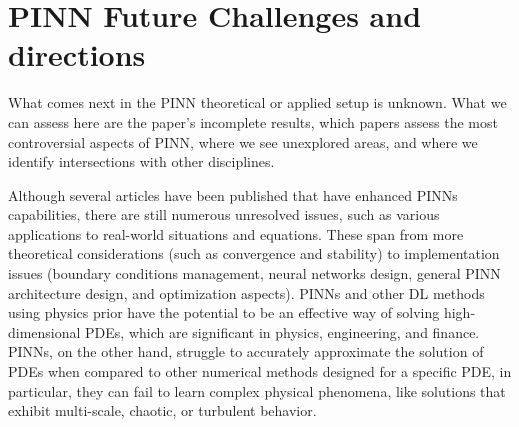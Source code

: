 \documentclass[pdflatex,sn-basic]{sn-jnl}%
\theoremstyle{thmstyleone}%
\theoremstyle{thmstyletwo}%
\theoremstyle{thmstylethree}%
\begin{document}
\FloatBarrier







% 










\section{PINN Future Challenges and directions}%

What comes next in the PINN theoretical or applied setup is unknown.
%
What we can assess here are the paper's incomplete results, which papers assess the most controversial aspects of PINN,  where we see unexplored areas, and where we identify intersections with other disciplines. 


Although several articles have been published that have enhanced PINNs capabilities, there are still numerous unresolved issues, such as various applications to real-world situations and equations. 
%
%
These span from more theoretical considerations (such as convergence and stability) to implementation issues (boundary conditions management, neural networks design, general PINN architecture design, and optimization aspects).
%
PINNs and other DL methods using physics prior have the potential to be an effective way of solving high-dimensional PDEs, which are significant in physics, engineering, and finance.
%
PINNs, on the other hand, struggle to accurately approximate the solution of PDEs when compared to other numerical methods designed for a specific PDE, in particular, they can fail to learn complex physical phenomena, like solutions that exhibit multi-scale, chaotic, or turbulent behavior.
\end{document}
